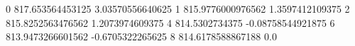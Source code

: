 0 817.653564453125 3.03570556640625
1 815.9776000976562 1.3597412109375
2 815.8252563476562 1.2073974609375
4 814.5302734375 -0.08758544921875
6 813.9473266601562 -0.6705322265625
8 814.6178588867188 0.0
